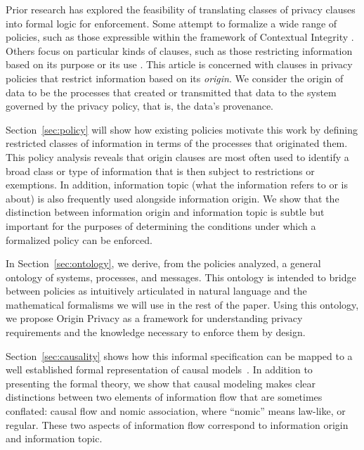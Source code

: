 \documentclass[../thesis.tex]{subfiles}
\begin{document}
Prior research has explored the feasibility of translating
classes of privacy clauses into formal logic for enforcement.
Some attempt to formalize a wide range of policies, such
as those expressible within the framework of Contextual
Integrity \cite{barth07csf,shvartzshnaider2017vaccine}.
Others focus on particular kinds of clauses, such as those
restricting information based on its purpose
\cite{tschantz13esorics} or its use \cite{datta2017use}.
This article is concerned with clauses in privacy policies
that restrict information based on its \emph{origin}.
We consider the origin of data to be the processes that 
created or transmitted that data to the system 
governed by the privacy policy, that is, the data's provenance.

Section~\ref{sec:policy} will show how existing
policies motivate this work
by defining restricted classes of information in terms
of the processes that originated them.
This policy analysis reveals that origin clauses are most
often used to identify a broad class or type of information
that is then subject to restrictions or exemptions.
In addition, information topic
(what the information refers to or is about) is also
frequently used alongside information origin.
We show that the distinction between information origin
and information topic is subtle but important for the
purposes of determining the conditions under which
a formalized policy can be enforced.

In Section~\ref{sec:ontology}, we derive, from the policies
analyzed, a general ontology of systems, processes, and messages.
This ontology is intended to bridge between policies as
intuitively articulated in natural language and the mathematical
formalisms we will use in the rest of the paper.
Using this ontology, we propose Origin Privacy as a
framework for understanding
privacy requirements and the knowledge necessary to enforce
them by design.

Section~\ref{sec:causality} shows how this informal
specification can be mapped to a well established
formal representation
of causal models~\cite{pearl1988probabilistic}.
In addition to presenting the formal theory,
we show that causal modeling makes clear distinctions
between two elements of information flow that are
sometimes conflated: causal flow and nomic association,
where ``nomic'' means law-like, or regular.
These two aspects of information flow correspond
to information origin and information topic.
\end{document}
